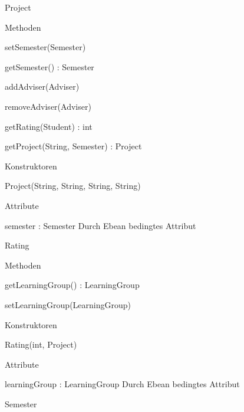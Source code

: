 \documentclass[parskip=full]{scrartcl}
\newcommand{\changeDescription}[1]{{\newline\color{black}\normalfont #1}}
\begin{document}
\begin{itemPackage}
\begin{itemClass}
\begin{itemClassSub}
\begin{itemPlus}
\end{itemPlus}
\end{itemClassSub}
\item Project
\begin{itemClassSub}
\item Methoden
\begin{itemPlus}
\item setSemester(Semester)
\item getSemester() : Semester
\item addAdviser(Adviser)
\item removeAdviser(Adviser)
\end{itemPlus}
\begin{itemMinus}
\item getRating(Student) : int
\item getProject(String, Semester) : Project
\end{itemMinus}
\item Konstruktoren
\begin{itemPlus}
\item Project(String, String, String, String)
\end{itemPlus}
\item Attribute 
\begin{itemPlus}
\item semester : Semester \changeDescription{Durch Ebean bedingtes Attribut}
\end{itemPlus}
\end{itemClassSub}
\item Rating
\begin{itemClassSub}
\item Methoden
\begin{itemPlus}
\item getLearningGroup() : LearningGroup
\item setLearningGroup(LearningGroup)
\end{itemPlus}
\item Konstruktoren
\begin{itemPlus}
\item Rating(int, Project)
\end{itemPlus}
\item Attribute 
\begin{itemPlus}
\item learningGroup : LearningGroup \changeDescription{Durch Ebean bedingtes
Attribut}
\end{itemPlus}
\end{itemClassSub}
\item Semester

\end{itemClass}
\end{itemPackage}
\end{document}
